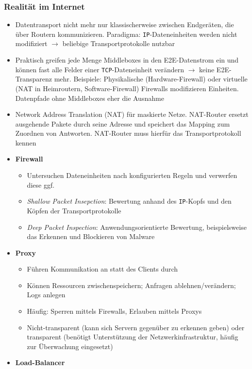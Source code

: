 \subsubsection{Realität im Internet}
\begin{itemize}
	\item Datentransport nicht mehr nur klassischerweise zwischen Endgeräten, die über Routern kommunizieren. Paradigma: \texttt{IP}-Dateneinheiten werden nicht modifiziert \(\rightarrow\) beliebige Transportprotokolle nutzbar
	\item Praktisch greifen jede Menge Middleboxes in den E2E-Datenstrom ein und können fast alle Felder einer \texttt{TCP}-Dateneinheit verändern \(\rightarrow\) keine E2E-Transparenz mehr. Beispiele: Physikalische (Hardware-Firewall) oder virtuelle (NAT in Heimroutern, Software-Firewall) Firewalls modifizieren Einheiten. Datenpfade ohne Middleboxes eher die Ausnahme
	\item Network Address Translation (NAT) für maskierte Netze. NAT-Router ersetzt ausgehende Pakete durch seine Adresse und speichert das Mapping zum Zuordnen von Antworten. NAT-Router muss hierfür das Transportprotokoll kennen
	\item \textbf{Firewall}
	\begin{itemize}
		\item Untersuchen Dateneinheiten nach konfigurierten Regeln und verwerfen diese ggf.
		\item \textit{Shallow Packet Insepction}: Bewertung anhand des \texttt{IP}-Kopfs und den Köpfen der Transportprotokolle
		\item \textit{Deep Packet Inspection}: Anwendungsorientierte Bewertung, beispielsweise das Erkennen und Blockieren von Malware
	\end{itemize}
	\item \textbf{Proxy}
	\begin{itemize}
		\item Führen Kommunikation an statt des Clients durch
		\item Können Ressourcen zwischenspeichern; Anfragen ablehnen/verändern; Logs anlegen
		\item Häufig: Sperren mittels Firewalls, Erlauben mittels Proxys
		\item Nicht-transparent (kann sich Servern gegenüber zu erkennen geben) oder transparent (benötigt Unterstützung der Netzwerkinfrastruktur, häufig zur Überwachung eingesetzt)
	\end{itemize}
	\item \textbf{Load-Balancer}

\end{itemize}
